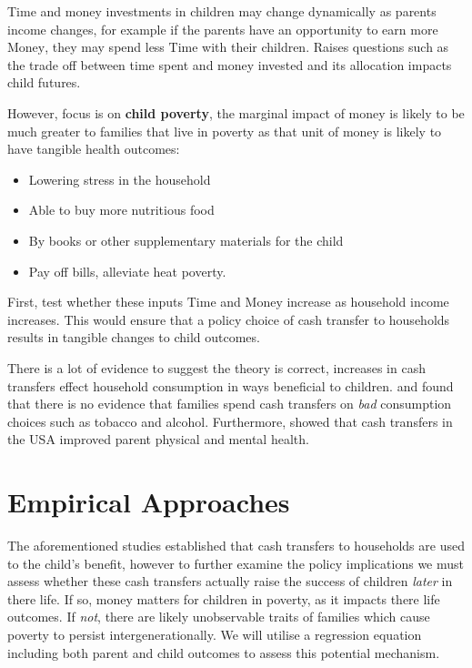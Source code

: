 \documentclass[../Main.tex]{subfiles}
\begin{document}
\begin{refsection}
Time and money investments in children may change dynamically as parents income
changes, for example if the parents have an opportunity to earn more
$\text{Money}$, they may spend less $\text{Time}$ with their children. Raises
questions such as the trade off between time spent and money invested and its
allocation impacts child futures. 

However, focus is on \textbf{child poverty}, the marginal impact of money is
likely to be much greater to families that live in poverty as that unit of money
is likely to have tangible health outcomes:

    
\begin{itemize}
    \item Lowering stress in the household 
    \item Able to buy more nutritious food 
    \item By books or other supplementary materials for the child
    \item Pay off bills, alleviate heat poverty. 
\end{itemize}

First, test whether these inputs $\text{Time}$ and $\text{Money}$ increase as
household income increases. This would ensure that a policy choice of cash
transfer to households results in tangible changes to child outcomes.

There is a lot of evidence to suggest the theory is correct, increases in cash
transfers effect household consumption in ways beneficial to children.
\textcite{gregg_family_2006} and \textcite{jones_impact_2018} found that there
is no evidence that families spend cash transfers on \textit{bad} consumption
choices such as tobacco and alcohol. Furthermore, \textcite{evans_giving_2014}
showed that cash transfers in the USA improved parent physical and mental
health.



\section{Empirical Approaches}

The aforementioned studies established that cash transfers to households are
used to the child's benefit, however to further examine the policy implications
we must assess whether these cash transfers actually raise the success of
children \textit{later} in there life. If so, money matters for children in
poverty, as it impacts there life outcomes. If \textit{not}, there are likely
unobservable traits of families which cause poverty to persist
intergenerationally. We will utilise a regression equation including both parent
and child outcomes to assess this potential mechanism. 


\end{refsection}
\end{document}
